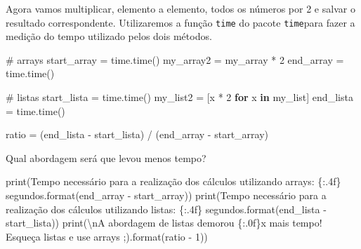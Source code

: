 \documentclass[
  brazilian,
  letterpaper,
  DIV=11,
  numbers=noendperiod]{scrreprt}
\newenvironment{Shaded}{\begin{snugshade}}{\end{snugshade}}
\newcommand{\BuiltInTok}[1]{\textcolor[rgb]{0.00,0.23,0.31}{#1}}
\newcommand{\CharTok}[1]{\textcolor[rgb]{0.13,0.47,0.30}{#1}}
\newcommand{\CommentTok}[1]{\textcolor[rgb]{0.37,0.37,0.37}{#1}}
\newcommand{\ControlFlowTok}[1]{\textcolor[rgb]{0.00,0.23,0.31}{\textbf{#1}}}
\newcommand{\DecValTok}[1]{\textcolor[rgb]{0.68,0.00,0.00}{#1}}
\newcommand{\KeywordTok}[1]{\textcolor[rgb]{0.00,0.23,0.31}{\textbf{#1}}}
\newcommand{\NormalTok}[1]{\textcolor[rgb]{0.00,0.23,0.31}{#1}}
\newcommand{\OperatorTok}[1]{\textcolor[rgb]{0.37,0.37,0.37}{#1}}
\newcommand{\SpecialCharTok}[1]{\textcolor[rgb]{0.37,0.37,0.37}{#1}}
\newcommand{\StringTok}[1]{\textcolor[rgb]{0.13,0.47,0.30}{#1}}
\begin{document}
Agora vamos multiplicar, elemento a elemento, todos os números por 2 e
salvar o resultado correspondente. Utilizaremos a função \texttt{time}
do pacote \texttt{time}para fazer a medição do tempo utilizado pelos
dois métodos.

\begin{Shaded}
\begin{Highlighting}[]
\CommentTok{\# arrays}
\NormalTok{start\_array }\OperatorTok{=}\NormalTok{ time.time()}
\NormalTok{my\_array2 }\OperatorTok{=}\NormalTok{ my\_array }\OperatorTok{*} \DecValTok{2}
\NormalTok{end\_array   }\OperatorTok{=}\NormalTok{ time.time()}


\CommentTok{\# listas}
\NormalTok{start\_lista }\OperatorTok{=}\NormalTok{ time.time()}
\NormalTok{my\_list2 }\OperatorTok{=}\NormalTok{ [x }\OperatorTok{*} \DecValTok{2} \ControlFlowTok{for}\NormalTok{ x }\KeywordTok{in}\NormalTok{ my\_list] }
\NormalTok{end\_lista   }\OperatorTok{=}\NormalTok{ time.time()}

\NormalTok{ratio }\OperatorTok{=}\NormalTok{ (end\_lista }\OperatorTok{{-}}\NormalTok{ start\_lista) }\OperatorTok{/}\NormalTok{ (end\_array }\OperatorTok{{-}}\NormalTok{ start\_array)}
\end{Highlighting}
\end{Shaded}

Qual abordagem será que levou menos tempo?

\begin{Shaded}
\begin{Highlighting}[]
\BuiltInTok{print}\NormalTok{(}\StringTok{\textquotesingle{}Tempo necessário para a realização dos cálculos utilizando arrays: }\SpecialCharTok{\{:.4f\}}\StringTok{ segundos\textquotesingle{}}\NormalTok{.}\BuiltInTok{format}\NormalTok{(end\_array }\OperatorTok{{-}}\NormalTok{ start\_array))}
\BuiltInTok{print}\NormalTok{(}\StringTok{\textquotesingle{}Tempo necessário para a realização dos cálculos utilizando listas: }\SpecialCharTok{\{:.4f\}}\StringTok{ segundos\textquotesingle{}}\NormalTok{.}\BuiltInTok{format}\NormalTok{(end\_lista }\OperatorTok{{-}}\NormalTok{ start\_lista))}
\BuiltInTok{print}\NormalTok{(}\StringTok{\textquotesingle{}}\CharTok{\textbackslash{}n}\StringTok{A abordagem de listas demorou }\SpecialCharTok{\{:.0f\}}\StringTok{x mais tempo! Esqueça listas e use arrays ;)\textquotesingle{}}\NormalTok{.}\BuiltInTok{format}\NormalTok{(ratio }\OperatorTok{{-}} \DecValTok{1}\NormalTok{))}
\end{Highlighting}
\end{Shaded}
\end{document}
